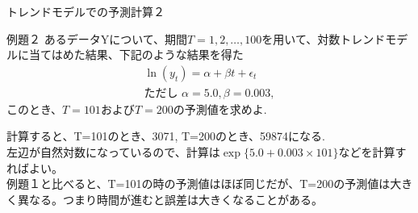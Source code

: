 \documentclass[dvipdfmx,autodetect-engine, unicode, 10pt, aspectratio=169]{beamer}
\begin{document}
\begin{frame}{トレンドモデルでの予測計算２}
    \begin{itembox}[i]{例題２}
        あるデータYについて、期間$T=1,2,\dotsc , 100$を用いて、対数トレンドモデルに当てはめた結果、下記のような結果を得た
        \begin{align*}
            \ln(y_t) = \alpha + \beta t + \epsilon_t \\
            \text{ただし  } \alpha = 5.0, \beta = 0.003, 
        \end{align*}
        このとき、$T=101$および$T=200$の予測値を求めよ.
    \end{itembox}
    計算すると、T=101のとき、3071, T=200のとき、59874になる. \\
    左辺が自然対数になっているので、計算は$\exp \{5.0 + 0.003 \times 101\}$などを計算すればよい。\\
    \vspace{10pt} 
    \footnotesize 例題１と比べると、T=101の時の予測値はほぼ同じだが、T=200の予測値は大きく異なる。つまり時間が進むと誤差は大きくなることがある。
\end{frame}
\end{document}
